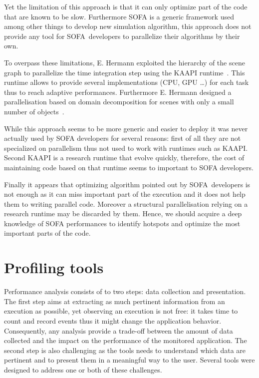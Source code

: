 Yet the limitation of this approach is that it can only optimize part of the
code that are known to be slow. Furthermore \gls{SOFA} is a generic framework
used among other things to develop new simulation algorithm, this approach
does not provide any tool for \gls{SOFA} developers to parallelize their
algorithms by their own.

To overpass these limitations, E. Hermann exploited the hierarchy of the scene
graph to parallelize the time integration step using the \gls{KAAPI}
runtime~\cite{Gautier07KAAPI}. This runtime allows to provide several
implementations (\gls{CPU}, \gls{GPU} \ldots) for each task thus to reach
adaptive performances. Furthermore E. Hermann designed a parallelisation based
on domain decomposition for scenes with only a small number of
objects~\cite{Hermann09Interactive}.

While this approach seems to be more generic and easier to deploy it was never
actually used by \gls{SOFA} developers for several reasons: first of all they
are not specialized on parallelism thus not used to work with runtimes such as
\gls{KAAPI}. Second \gls{KAAPI} is a research runtime that evolve quickly,
therefore, the cost of maintaining code based on that runtime seems to
important to \gls{SOFA} developers.

Finally it appears that optimizing algorithm pointed out by
\gls{SOFA} developers is not enough as it can miss important part of the
execution and it does not help them to writing parallel code. Moreover
a structural parallelisation relying on a research runtime may be discarded by
them. Hence, we should acquire a deep knowledge of \gls{SOFA}
performances to identify hotspots and optimize the most important parts of
the code.

\section{Profiling tools}
\label{sec:prof-tools}

Performance analysis consists of to two steps: data collection and
presentation. The first step aims at extracting as much pertinent information
from an execution as possible, yet observing an execution is not free: it
takes time to count and record events thus it might change the application
behavior. Consequently, any analysis provide a trade-off between the amount of
data collected and the impact on the performance of the monitored application.
The second step is also challenging as the tools needs to understand which
data are pertinent and to present them in a meaningful way to the user.
Several tools were designed to address one or both of these challenges.

